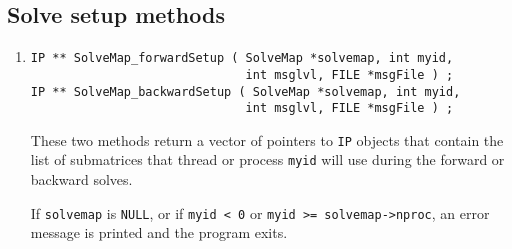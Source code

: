 \subsection{Solve setup methods}
\label{subsection:SolveMap:proto:setup}
\par
\begin{enumerate}
\item
\begin{verbatim}
IP ** SolveMap_forwardSetup ( SolveMap *solvemap, int myid, 
                              int msglvl, FILE *msgFile ) ;
IP ** SolveMap_backwardSetup ( SolveMap *solvemap, int myid, 
                              int msglvl, FILE *msgFile ) ;
\end{verbatim}
These two methods return a vector of pointers to {\tt IP} objects
that contain the list of submatrices that thread or process
{\tt myid} will use during the forward or backward solves.
\par {}
If {\tt solvemap} is {\tt NULL},
or if {\tt myid < 0} or {\tt myid >= solvemap->nproc},
an error message is printed and the program exits.
\end{enumerate}
\par
